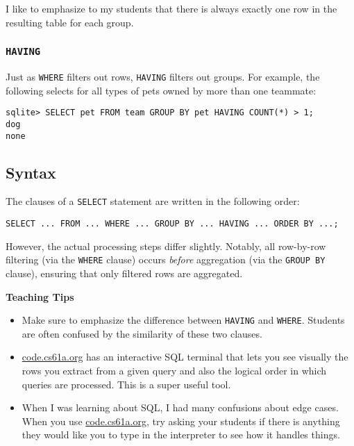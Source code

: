\begin{meta}
I like to emphasize to my students that there is always exactly one row in the resulting table for each group. 
\end{meta}

\subsubsection{\lstinline{HAVING}}
Just as \lstinline{WHERE} filters out rows, \lstinline{HAVING} filters out groups. For example, the following selects for all types of pets owned by more than one teammate: 
\begin{lstlisting}
sqlite> SELECT pet FROM team GROUP BY pet HAVING COUNT(*) > 1; 
dog
none
\end{lstlisting}

\subsection{Syntax}
The clauses of a \lstinline{SELECT} statement are written in the following order: 
\begin{lstlisting}
SELECT ... FROM ... WHERE ... GROUP BY ... HAVING ... ORDER BY ...;
\end{lstlisting}
However, the actual processing steps differ slightly. Notably, all row-by-row filtering (via the \lstinline{WHERE} clause) occurs \textit{before} aggregation (via the \lstinline{GROUP BY} clause), ensuring that only filtered rows are aggregated.

\begin{guide}
\begin{blocksection}
\textbf{Teaching Tips}
\begin{itemize}
    \item Make sure to emphasize the difference between \lstinline{HAVING} and \lstinline{WHERE}. Students are often confused by the similarity of these two clauses. 
    \item \url{code.cs61a.org} has an interactive SQL terminal that lets you see visually the rows you extract from a given query and also the logical order in which queries are processed. This is a super useful tool. 
    \item When I was learning about SQL, I had many confusions about edge cases. When you use \url{code.cs61a.org}, try asking your students if there is anything they would like you to type in the interpreter to see how it handles things. 
\end{itemize}
\end{blocksection}
\end{guide}